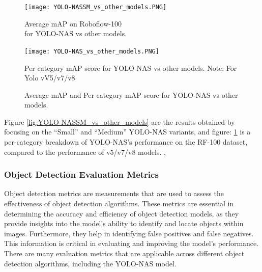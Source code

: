 \begin{figure}[H]
  \begin{minipage}{0.48\textwidth}
    \centering
    \texttt{[image: YOLO-NASSM\_vs\_other\_models.PNG]}
    \caption{Average mAP on Roboflow-100 \\for YOLO-NAS vs other models.}
    \label{fig:YOLO-NASSM_vs_other_models}
  \end{minipage}%
  \begin{minipage}{0.5\textwidth}
    \centering
    \texttt{[image: YOLO-NAS\_vs\_other\_models.PNG]}
    \caption{Per category mAP score for YOLO-NAS vs other models.
    Note: For Yolo vV5/v7/v8}
    \label{fig:YOLO-NAS_vs_other_models}
  \end{minipage}
  \caption{Average mAP and Per category mAP score for YOLO-NAS vs other models. \cite{YOLO-NAS}}
\end{figure}
Figure \ref{fig:YOLO-NASSM_vs_other_models} are the results obtained by focusing on the “Small” and “Medium” YOLO-NAS variants, and figure: \ref{fig:YOLO-NAS_vs_other_models} is a per-category breakdown of YOLO-NAS’s performance on the RF-100 dataset, compared to the performance of v5/v7/v8 models. \cite{YOLO-NAS}, \cite{yolo-nas-v8-sota}
\subsubsection{Object Detection Evaluation Metrics}
Object detection metrics are measurements that are used to assess the effectiveness of object detection algorithms. These metrics are essential in determining the accuracy and efficiency of object detection models, as they provide insights into the model's ability to identify and locate objects within images. Furthermore, they help in identifying false positives and false negatives. This information is critical in evaluating and improving the model's performance. There are many evaluation metrics that are applicable across different object detection algorithms, including the YOLO-NAS model. \cite{metrics}

